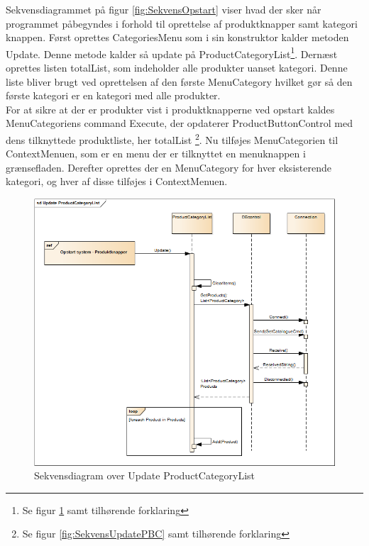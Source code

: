 Sekvensdiagrammet på figur \ref{fig:SekvensOpstart} viser hvad der sker når programmet påbegyndes i forhold til oprettelse af produktknapper samt kategori knappen. Først oprettes CategoriesMenu som i sin konstruktor kalder metoden Update. Denne metode kalder så update på ProductCategoryList\footnote{Se figur \ref{fig:SekvensUpdatePCL} samt tilhørende forklaring}. Dernæst oprettes listen totalList, som indeholder alle produkter uanset kategori. Denne liste bliver brugt ved oprettelsen af den første MenuCategory hvilket gør så den første kategori er en kategori med alle produkter. \\
For at sikre at der er produkter vist i produktknapperne ved opstart kaldes MenuCategoriens command Execute, der opdaterer ProductButtonControl med dens tilknyttede produktliste, her totalList \footnote{Se figur \ref{fig:SekvensUpdatePBC} samt tilhørende forklaring}. Nu tilføjes MenuCategorien til ContextMenuen, som er en menu der er tilknyttet en menuknappen i grænsefladen. Derefter oprettes der en MenuCategory for hver eksisterende kategori, og hver af disse tilføjes i ContextMenuen.

\begin{figure}[H]
	\centering
	\includegraphics[width=1\textwidth]{Systemdesign/Frontend/GUI/DesignOgStruktur/Pics/UpdateProductCategoryList}
	\caption{Sekvensdiagram over Update ProductCategoryList}
	\label{fig:SekvensUpdatePCL}
\end{figure}

